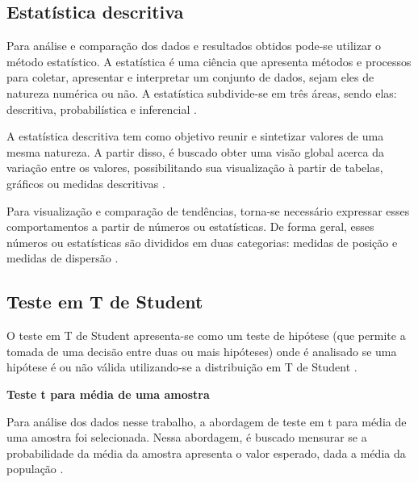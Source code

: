 \subsection{Estatística descritiva}

Para análise e comparação dos dados e resultados obtidos pode-se utilizar o método estatístico. A estatística é uma ciência que apresenta métodos e processos para coletar, apresentar e interpretar um conjunto de dados, sejam eles de natureza numérica ou não. A estatística subdivide-se em três áreas, sendo elas: descritiva, probabilística e inferencial \cite{guedes2005estatistica}.

A estatística descritiva tem como objetivo reunir e sintetizar valores de uma mesma natureza. A partir disso, é buscado obter uma visão global acerca da variação entre os valores, possibilitando sua visualização à partir de tabelas, gráficos ou medidas descritivas \cite{guedes2005estatistica}. 

Para visualização e comparação de tendências, torna-se necessário expressar esses comportamentos a partir de números ou estatísticas. De forma geral, esses números ou estatísticas são divididos em duas categorias: medidas de posição e medidas de dispersão \cite{guedes2005estatistica}.

\subsection{Teste em T de Student}

O teste em T de Student apresenta-se como um teste de hipótese (que permite a tomada de uma decisão entre duas ou mais hipóteses) onde é analisado se uma hipótese é ou não válida utilizando-se a distribuição em T de Student \cite{d1990conceitos}.

\textbf{Teste t para média de uma amostra}

Para análise dos dados nesse trabalho, a abordagem de teste em t para média de uma amostra foi selecionada. Nessa abordagem, é buscado mensurar se a probabilidade da média da amostra apresenta o valor esperado, dada a média da população \cite{d1990conceitos}.